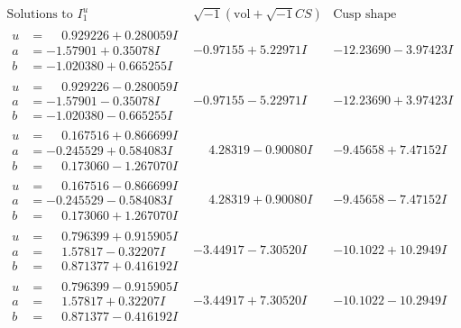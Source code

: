 \documentclass[1p]{elsarticle_modified}
\theoremstyle{definition}
\newcommand{\I}{\sqrt{-1}}
\begin{document}
$$\begin{array}{c|c|c}  
\text{Solutions to }I^u_{1}& \I (\text{vol} + \sqrt{-1}CS) & \text{Cusp shape}\\
 \hline 
\begin{aligned}
u &= \phantom{-}0.929226 + 0.280059 I \\
a &= -1.57901 + 0.35078 I \\
b &= -1.020380 + 0.665255 I\end{aligned}
 & -0.97155 + 5.22971 I & -12.23690 - 3.97423 I \\ \hline\begin{aligned}
u &= \phantom{-}0.929226 - 0.280059 I \\
a &= -1.57901 - 0.35078 I \\
b &= -1.020380 - 0.665255 I\end{aligned}
 & -0.97155 - 5.22971 I & -12.23690 + 3.97423 I \\ \hline\begin{aligned}
u &= \phantom{-}0.167516 + 0.866699 I \\
a &= -0.245529 + 0.584083 I \\
b &= \phantom{-}0.173060 - 1.267070 I\end{aligned}
 & \phantom{-}4.28319 - 0.90080 I & -9.45658 + 7.47152 I \\ \hline\begin{aligned}
u &= \phantom{-}0.167516 - 0.866699 I \\
a &= -0.245529 - 0.584083 I \\
b &= \phantom{-}0.173060 + 1.267070 I\end{aligned}
 & \phantom{-}4.28319 + 0.90080 I & -9.45658 - 7.47152 I \\ \hline\begin{aligned}
u &= \phantom{-}0.796399 + 0.915905 I \\
a &= \phantom{-}1.57817 - 0.32207 I \\
b &= \phantom{-}0.871377 + 0.416192 I\end{aligned}
 & -3.44917 - 7.30520 I & -10.1022 + 10.2949 I \\ \hline\begin{aligned}
u &= \phantom{-}0.796399 - 0.915905 I \\
a &= \phantom{-}1.57817 + 0.32207 I \\
b &= \phantom{-}0.871377 - 0.416192 I\end{aligned}
 & -3.44917 + 7.30520 I & -10.1022 - 10.2949 I \\ \hline\begin{aligned}

\end{aligned}
\end{array}$$
\end{document}
